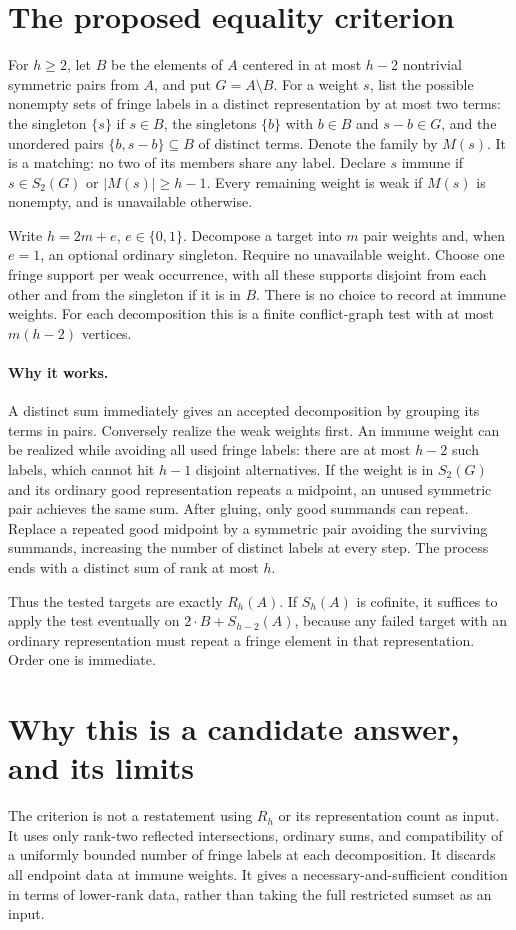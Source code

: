 \documentclass[11pt]{article}
\begin{document}
\section{The proposed equality criterion}
For $h\ge2$, let $B$ be the elements of $A$ centered in at most
$h-2$ nontrivial symmetric pairs from $A$, and put $G=A\setminus B$.
For a weight $s$, list the possible nonempty sets of fringe labels
in a distinct representation by at most two terms: the singleton
$\{s\}$ if $s\in B$, the singletons $\{b\}$ with $b\in B$ and
$s-b\in G$, and the unordered pairs $\{b,s-b\}\subseteq B$
of distinct terms. Denote the family by $M(s)$.
It is a matching: no two of its members share any label.
Declare $s$ immune if $s\in S_2(G)$ or $|M(s)|\ge h-1$.
Every remaining weight is weak if $M(s)$ is nonempty, and is
unavailable otherwise.

Write $h=2m+e$, $e\in\{0,1\}$. Decompose a target into $m$
pair weights and, when $e=1$, an optional ordinary singleton.
Require no unavailable weight. Choose one fringe support per
weak occurrence, with all these supports disjoint from each other
and from the singleton if it is in $B$. There is no choice to record
at immune weights. For each decomposition this is a finite
conflict-graph test with at most $m(h-2)$ vertices.

\paragraph{Why it works.}
A distinct sum immediately gives an accepted decomposition by
grouping its terms in pairs. Conversely realize the weak weights
first. An immune weight can be realized while avoiding all used
fringe labels: there are at most $h-2$ such labels, which cannot
hit $h-1$ disjoint alternatives. If the weight is in $S_2(G)$
and its ordinary good representation repeats a midpoint, an unused
symmetric pair achieves the same sum. After gluing, only good
summands can repeat. Replace a repeated good midpoint by a symmetric
pair avoiding the surviving summands, increasing the number of
distinct labels at every step. The process ends with a distinct
sum of rank at most $h$.

Thus the tested targets are exactly $R_h(A)$. If $S_h(A)$ is
cofinite, it suffices to apply the test eventually on
$2\cdot B+S_{h-2}(A)$, because any failed target with an ordinary
representation must repeat a fringe element in that representation.
Order one is immediate.

\section{Why this is a candidate answer, and its limits}
The criterion is not a restatement using $R_h$ or its
representation count as input. It uses only rank-two reflected
intersections, ordinary sums, and compatibility of a uniformly
bounded number of fringe labels at each decomposition. It discards
all endpoint data at immune weights. It gives a necessary-and-sufficient condition in
terms of lower-rank data, rather than taking the full restricted
sumset as an input.
\end{document}
